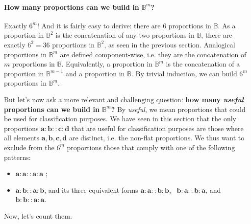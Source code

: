 \paragraph{How many proportions can we build in $\mathbb{B}^m$?\\}
\label{SEC:number_of_parallelograms_in_Bm}

Exactly $6^m$! And it is fairly easy to derive: there are $6$ proportions in
$\mathbb{B}$. As a proportion in $\mathbb{B}^2$ is the concatenation of any two
proportions in $\mathbb{B}$, there are exactly $6^2 = 36$ proportions in
$\mathbb{B}^2$, as seen in the previous section. Analogical proportions in
$\mathbb{B}^m$ are defined component-wise, i.e. they are the concatenation of
$m$ proportions in $\mathbb{B}$. Equivalently, a proportion in $\mathbb{B}^m$
is the concatenation of a proportion in $\mathbb{B}^{m - 1}$ and a proportion
in $\mathbb{B}$. By trivial induction, we can build $6^m$ proportions in
$\mathbb{B}^m$.

But let's now ask a more relevant and challenging question: \textbf{how many
\textit{useful} proportions can we build in $\mathbb{B}^m$?} By
\textit{useful}, we mean proportions that could be used for classification
purposes.  We have seen in this section that the only proportions
$\mathbf{a} : \mathbf{b} :: \mathbf{c} : \mathbf{d}$ that are useful for
classification purposes are those where all elements $\mathbf{a}, \mathbf{b},
\mathbf{c}, \mathbf{d}$ are distinct, i.e. the non-flat proportions. We thus
want to exclude from the $6^m$ proportions those that comply with one of the
following patterns:

\begin{itemize}
  \item $\mathbf{a}: \mathbf{a} :: \mathbf{a} : \mathbf{a}$ ;
  \item $\mathbf{a}: \mathbf{b} :: \mathbf{a} : \mathbf{b}$, and its three
    equivalent forms $\mathbf{a}: \mathbf{a} :: \mathbf{b} : \mathbf{b}$,~
    $\mathbf{b}: \mathbf{a} :: \mathbf{b} : \mathbf{a}$, and $\mathbf{b}:
    \mathbf{b} :: \mathbf{a} : \mathbf{a}$.
\end{itemize}

Now, let's count them.

